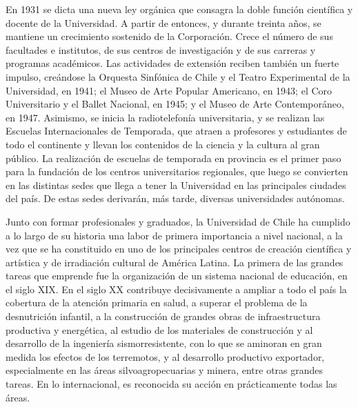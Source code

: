En 1931 se dicta una nueva ley orgánica que consagra la doble función científica y docente de
la Universidad. A partir de entonces, y durante treinta años, se mantiene un crecimiento sostenido
de la Corporación. Crece el número de sus facultades e institutos, de sus centros de investigación
y de sus carreras y programas académicos. Las actividades de extensión reciben también un fuerte
impulso, creándose la Orquesta Sinfónica de Chile y el Teatro Experimental de la Universidad, en
1941; el Museo de Arte Popular Americano, en 1943; el Coro Universitario y el Ballet Nacional,
en 1945; y el Museo de Arte Contemporáneo, en 1947. Asimismo, se inicia la radiotelefonía
universitaria, y se realizan las Escuelas Internacionales de Temporada, que atraen a profesores y
estudiantes de todo el continente y llevan los contenidos de la ciencia y la cultura al gran público.
La realización de escuelas de temporada en provincia es el primer paso para la fundación de los
centros universitarios regionales, que luego se convierten en las distintas sedes que llega a tener
la Universidad en las principales ciudades del país. De estas sedes derivarán, más tarde, diversas
universidades autónomas.

Junto con formar profesionales y graduados, la Universidad de Chile ha cumplido a lo largo
de su historia una labor de primera importancia a nivel nacional, a la vez que se ha constituido en
uno de los principales centros de creación científica y artística y de irradiación cultural de América
Latina. La primera de las grandes tareas que emprende fue la organización de un sistema nacional
de educación, en el siglo XIX. En el siglo XX contribuye decisivamente a ampliar a todo el país
la cobertura de la atención primaria en salud, a superar el problema de la desnutrición infantil,
a la construcción de grandes obras de infraestructura productiva y energética, al estudio de los
materiales de construcción y al desarrollo de la ingeniería sismorresistente, con lo que se aminoran
en gran medida los efectos de los terremotos, y al desarrollo productivo exportador, especialmente
en las áreas silvoagropecuarias y minera, entre otras grandes tareas. En lo internacional, es
reconocida su acción en prácticamente todas las áreas.

